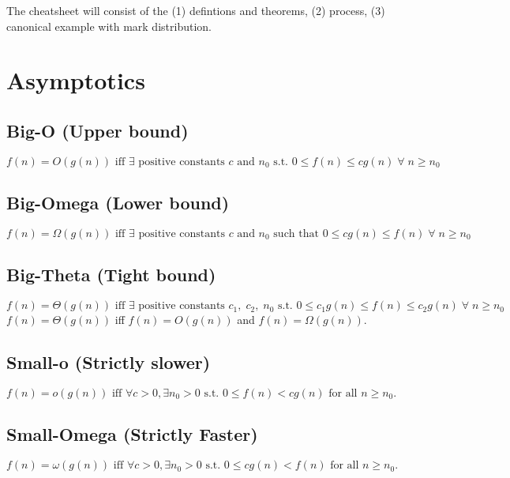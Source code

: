\documentclass{article}
\begin{document}
The cheatsheet will consist of the (1) defintions and theorems, (2) process, (3) canonical example with mark distribution. 

\section{Asymptotics}

\subsection{Big-O (Upper bound)}
\begin{definition}
    $ f(n) = O(g(n)) \text{ iff } \exists \text{ positive constants } c \text{ and } n_0 \text{ s.t. } 0 \leq f(n) \leq c g(n) \; \forall \; n \geq n_0 $
\end{definition}

\subsection{Big-Omega (Lower bound)}
\begin{definition}
    $ f(n) = \Omega(g(n)) \text{ iff } \exists \text{ positive constants } c \text{ and } n_0 \text{ such that } 0 \leq c g(n) \leq f(n) \; \forall \; n \geq n_0 $
\end{definition}

\subsection{Big-Theta (Tight bound)}
\begin{definition}
    $ f(n) = \Theta(g(n)) \text{ iff } \exists \text{ positive constants } c_1, \; c_2, \; n_0 \text{ s.t. } 0 \leq c_1 g(n) \leq f(n) \leq c_2 g(n) \; \forall \; n \geq n_0 $
    \vspace{1em}
    $f(n) = \Theta(g(n))$ iff $f(n) = O(g(n))$ and $f(n)=\Omega(g(n))$.
\end{definition}

\subsection{Small-o (Strictly slower)}
\begin{definition}
    $f(n) = o(g(n)) \text{ iff } \forall c > 0, \exists n_0 > 0 \text{ s.t. } 0 \leq f(n) < c g(n) \text{ for all } n \geq n_0.$
\end{definition}

\subsection{Small-Omega (Strictly Faster)}
\begin{definition}
    $f(n) = \omega(g(n)) \text{ iff } \forall c > 0, \exists n_0 > 0 \text{ s.t. } 0 \leq c g(n) < f(n) \text{ for all } n \geq n_0.$
\end{definition}
\end{document}
